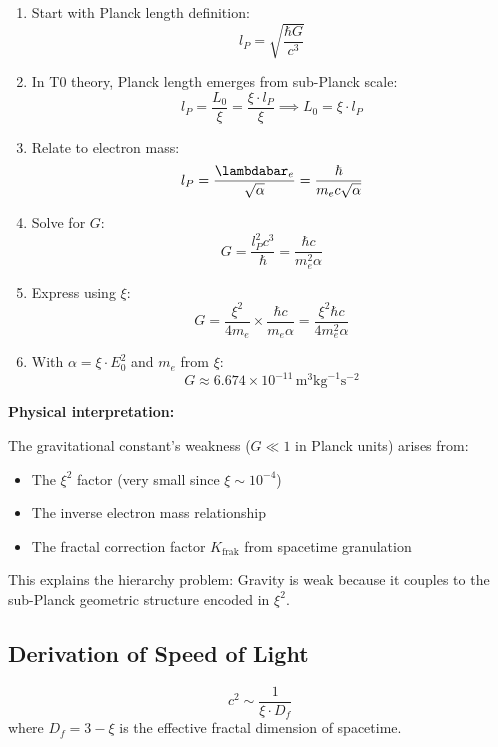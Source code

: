 	\begin{enumerate}
		\item Start with Planck length definition:
		\[
		l_P = \sqrt{\frac{\hbar G}{c^3}}
		\]
		
		\item In T0 theory, Planck length emerges from sub-Planck scale:
		\[
		l_P = \frac{L_0}{\xi} = \frac{\xi \cdot l_P}{\xi} \implies L_0 = \xi \cdot l_P
		\]
		
		\item Relate to electron mass:
		\[
		l_P = \frac{\lambdabar_e}{\sqrt{\alpha}} = \frac{\hbar}{m_e c \sqrt{\alpha}}
		\]
		
		\item Solve for $G$:
		\[
		G = \frac{l_P^2 c^3}{\hbar} = \frac{\hbar c}{m_e^2 \alpha}
		\]
		
		\item Express using $\xi$:
		\[
		G = \frac{\xi^2}{4 m_e} \times \frac{\hbar c}{m_e \alpha} = \frac{\xi^2 \hbar c}{4 m_e^2 \alpha}
		\]
		
		\item With $\alpha = \xi \cdot E_0^2$ and $m_e$ from $\xi$:
		\[
		G \approx 6.674 \times 10^{-11}\,\text{m}^3\text{kg}^{-1}\text{s}^{-2}
		\]
	\end{enumerate}
	
	\textbf{Physical interpretation:}
	
	The gravitational constant's weakness ($G \ll 1$ in Planck units) arises from:
	\begin{itemize}
		\item The $\xi^2$ factor (very small since $\xi \sim 10^{-4}$)
		\item The inverse electron mass relationship
		\item The fractal correction factor $K_{\text{frak}}$ from spacetime granulation
	\end{itemize}
	
	This explains the hierarchy problem: Gravity is weak because it couples to the sub-Planck geometric structure encoded in $\xi^2$.
	
	\subsection{Derivation of Speed of Light}
	
	\begin{keyresult}
		\[
		c^2 \sim \frac{1}{\xi \cdot D_f}
		\]
		where $D_f = 3 - \xi$ is the effective fractal dimension of spacetime.
	\end{keyresult}
	
